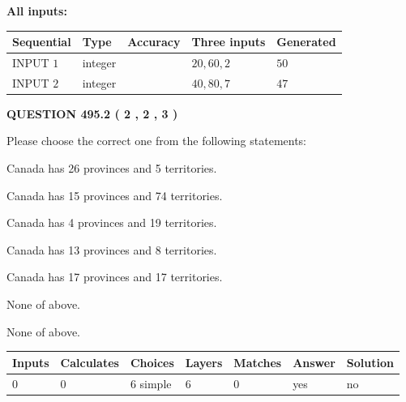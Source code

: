 \documentclass[12pt]{article}
\begin{document}
   
   
   
\noindent\vspace{0.1in}\hspace{-0.08in} {\textbf{\Large{All inputs: }}}
   
   
  
  
\noindent\begin{tabular}{|l|l|l|l|l|}
\hline
 Sequential & Type & Accuracy & Three inputs & Generated \\ 
\hline
 
 
  INPUT $  1 $ & integer &  & $
 20
 , 
 60
 , 
 2
 $ & $ 50 $ 
 \\  \hline  
 
 
  INPUT $  2 $ & integer &  & $
 40
 , 
 80
 , 
 7
 $ & $ 47 $ 
 \\  \hline  
 \end{tabular}
   
   
  
\vspace{0.2in}
  
{\textbf{\Large{QUESTION
495.2 
 ( 2 , 2 , 3 )
}}}
  
  
Please choose the correct one from the following statements:
 
 
Canada has  26 provinces and  5 territories.
 
 
Canada has  15 provinces and  74 territories.
 
 
Canada has   4 provinces and  19 territories.
 
 
Canada has  13 provinces and  8 territories.
 
 
Canada has  17 provinces and  17 territories.
 
 
 None of above.
 
 
\noindent{}
 
 
 None of above.
 
 
\noindent{}
 
 
   
   
   
   
\noindent\begin{tabular}{|l|l|l|l|l|l|l|}
 \hline
Inputs & Calculates & Choices & Layers & Matches & Answer & Solution \\ \hline
 0  & 
 0  & 
 6
  simple  
  & 
 6  & 
 0  & 
  yes & 
  no 
  \\ \hline
 \end{tabular}
   
\end{document}
